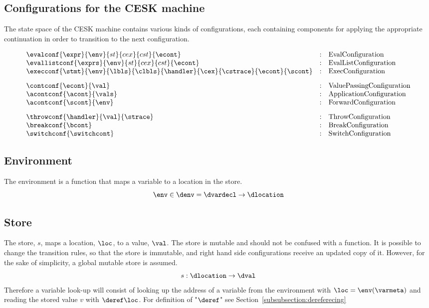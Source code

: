 \documentclass{article}
\begin{document}
\subsection{Configurations for the CESK machine}
\label{subsec:cesk-configs}
The state space of the CESK machine contains various kinds of configurations, each containing components for applying the appropriate continuation in order to transition to the next configuration. 

\[
  \begin{array}{lcl}
	\evalconf{\expr}{\env}{st}{cex}{cst}{\econt} & : &
	\textrm{EvalConfiguration}\\

	\evallistconf{\exprs}{\env}{st}{cex}{cst}{\econt} & : &
	\textrm{EvalListConfiguration}\\

	\execconf{\stmt}{\env}{\lbls}{\clbls}{\handler}{\cex}{\cstrace}{\econt}{\scont}  & : &
	\textrm{ExecConfiguration}\\[3mm]

	\contconf{\econt}{\val} & : &
	\textrm{ValuePassingConfiguration}\\

	\acontconf{\acont}{\vals} & : &
	\textrm{ApplicationConfiguration}\\

	\acontconf{\scont}{\env} & : &
	\textrm{ForwardConfiguration}\\[3mm]

	\throwconf{\handler}{\val}{\strace} & : &
	\textrm{ThrowConfiguration}\\

	\breakconf{\bcont} & : &
	\textrm{BreakConfiguration}\\

	\switchconf{\switchcont} & : &
	\textrm{SwitchConfiguration}\\

  \end{array}
\]
\subsection{Environment}
\label{subsec:env-definition}
The environment is a function that maps a variable to a location in the store.
\[\env \in \denv = \dvardecl \rightarrow \dlocation\] 
\subsection{Store}
\label{subsec:store-definition}
The store, $s$, maps a location, $\loc$, to a value, $\val$. The store is mutable and should not be confused with a function. It is possible to change the transition rules, so that the store is immutable, and right hand side configurations receive an updated copy of it. However, for the sake of simplicity, a global mutable store is assumed. 
\[s : \dlocation \rightarrow \dval \]
Therefore a variable look-up will consist of looking up the address of a variable from the environment with $\loc = \env(\varmeta)$ and reading the stored value $v$ with $\deref\loc$. For definition of "$\deref$" see Section~\ref{subsubsection:dereferecing} 
\end{document}
